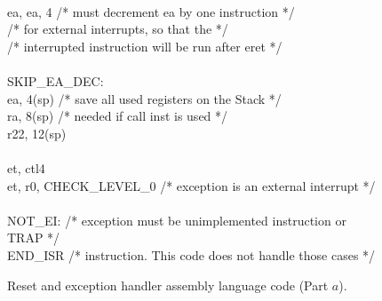 \begin{figure}[h!]
\begin{center}
\begin{minipage}[t]{12.5 cm}
\begin{tabbing}
~\\
 \>ea, ea, 4 \>/* must decrement ea by one instruction */\\
\>\>\>/* for external interrupts, so that the */\\
\>\>\>/* interrupted instruction will be run after eret */\\
~\\
SKIP\_EA\_DEC:\\
 \>ea, 4(sp) \>/* save all used registers on the Stack */\\
 \>ra, 8(sp) \>/* needed if call inst is used */\\
 \>r22, 12(sp)\\
~\\
 \>et, ctl4\\
 \>et, r0, CHECK\_LEVEL\_0 \>/* exception is an external interrupt */\\
~\\
NOT\_EI: \>\>\>/* exception must be unimplemented instruction or TRAP */\\
 \>END\_ISR \>/* instruction. This code does not handle those cases */\\
\end{tabbing}
\end{minipage}
\end{center}
	\caption{Reset and exception handler assembly language code (Part $a$).}
   \label{fig:exception_handler_s}
\end{figure}
\pagebreak
\clearpage
\newpage


